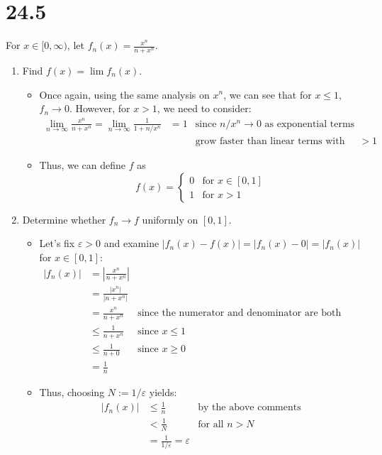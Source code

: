 \documentclass[10pt,a4paper]{article}
\theoremstyle{definition}
\begin{document}
\section*{24.5}
For $x \in [0, \infty)$, let $\displaystyle f_n(x) = \frac{x^n}{n + x^n}$.
\begin{enumerate}[label = (\alph*)]
\item Find $f(x) = \lim f_n(x)$.
	\begin{itemize}
	\item Once again, using the same analysis on $x^n$, we can see that for $x \leq 1$, $f_n \to 0$. However, for $x > 1$, we need to consider:
	\begin{align*}
	\lim_{n \to \infty} \frac{x^n}{n + x^n} = \lim_{n \to \infty} \frac{1}{1 + n/x^n} &= 1 &\text{since $n/x^n \to 0$ as exponential terms}\\
	& &\text{grow faster than linear terms with base $>1$}
	\end{align*}
	\item Thus, we can define $f$ as 
	\[f(x) = \begin{cases}
	0 &\text{for $x \in [0,1]$}\\
	1 &\text{for $x > 1$}
	\end{cases}\]
	\end{itemize}
\item Determine whether $f_n \to f$ uniformly on $[0,1]$.
	\begin{itemize}
	\item Let's fix $\varepsilon > 0$ and examine $|f_n(x) - f(x)| = |f_n(x) - 0|  = |f_n(x)|$ for $x \in [0,1]$:
	\begin{align*}
	|f_n(x)| &= \left|\frac{x^n}{n + x^n}\right|\\
	&= \frac{|x^n|}{|n + x^n|}\\
	&= \frac{x^n}{n + x^n} &\text{since the numerator and denominator are both positive}\\
	&\leq \frac{1}{n + x^n} &\text{since $x \leq 1$}\\
	&\leq \frac{1}{n + 0} &\text{since $x \geq 0$}\\
	&= \frac{1}{n}
	\end{align*}
	\item Thus, choosing $N := 1/\varepsilon$ yields:
	\begin{align*}
	|f_n(x)| &\leq \frac{1}{n} &\text{by the above comments}\\
	&< \frac{1}{N} &\text{for all $n > N$}\\
	&= \frac{1}{1/\varepsilon} = \varepsilon
	\end{align*}

\end{itemize}
\end{enumerate}
\end{document}
